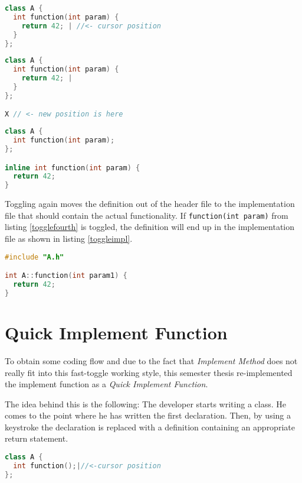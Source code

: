 \begin{lstlisting}[caption={Startposition of toggling},
label={togglefirst}, language=C++]
class A {
  int function(int param) {
    return 42; | //<- cursor position
  }
};
\end{lstlisting}

\begin{lstlisting}[caption={New position is found},
label={togglethird}, language=C++]
class A {
  int function(int param) {
    return 42; |
  }
};

X // <- new position is here
\end{lstlisting}

\begin{lstlisting}[caption={Class with declaration and inlined definition},
label={togglefourth}, language=C++]
class A {
  int function(int param);
};

inline int function(int param) {
  return 42;
}
\end{lstlisting}

Toggling again moves the definition out of the header file to the 
implementation file that should contain the actual functionality. If
\texttt{function(int param)} from listing \ref{togglefourth} is toggled,
the definition will end up in the implementation file as shown in listing
\ref{toggleimpl}.

\begin{lstlisting}[caption={Defintion in an implementation file},
label={toggleimpl}, language=C++]
#include "A.h"

int A::function(int param1) {
  return 42;
}
\end{lstlisting}

\section*{Quick Implement Function}

To obtain some coding flow and due to the fact that \textit{Implement
Method} does not really fit into this fast-toggle working style, this semester
thesis re-implemented the implement function as a \textit{Quick Implement
Function}.

The idea behind this is the following: The developer starts writing a class.
He comes to the point where he has written the first declaration. Then, by using a
keystroke the declaration is replaced with a definition containing an
appropriate return statement.

\begin{lstlisting}[caption={Situation before quick implement},
label={beforeimpl}, language=C++]
class A {
  int function();|//<-cursor position
};
\end{lstlisting}

